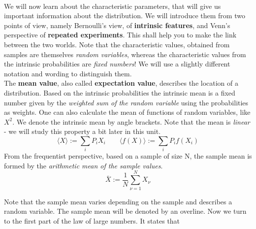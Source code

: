 \documentclass[12pt, a4paper]{scrartcl}
\begin{document}
\\

We will now learn about the characteristic parameters, that will give us important information about the distribution. We will introduce them from two points of view, namely Bernoulli’s view, of \textbf{intrinsic features}, and Venn’s perspective of \textbf{repeated experiments}.
This shall help you to make the link between the two worlds.
Note that the characteristic values, obtained from samples are themselves \textit{random variables}, whereas the characteristic values from the intrinsic probabilities are \textit{fixed numbers}! 
We will use a slightly different notation and wording to distinguish them.\\

The \textbf{mean value}, also called \textbf{expectation value}, describes the location of a distribution.
Based on the intrinsic probabilities the intrinsic mean is a fixed number given by the \textit{weighted sum of the random variable} using the probabilities as weights. One can also calculate the mean of functions of random variables, like $X^2$. We denote the intrinsic mean by angle brackets.
Note that the mean is \textit{linear} - we will study this property a bit later in this unit.\\
\begin{equation*}\boxed{\langle X \rangle := \sum_iP_iX_i \qquad
\langle f(X) \rangle := \sum_iP_if(X_i)}\end{equation*}
From the frequentist perspective, based on a sample of size N, the sample mean is formed by the \textit{arithmetic mean of the sample values}. \\

\begin{equation*}\boxed{\bar{X} := \frac{1}{N}\sum_{\nu=1}^N X_\nu}\end{equation*}

Note that the sample mean varies depending on the sample and describes a random variable. The sample mean will be denoted by an overline. 
Now we turn to the first part of the law of large numbers. It states that \\
\\
\\
\end{document}
